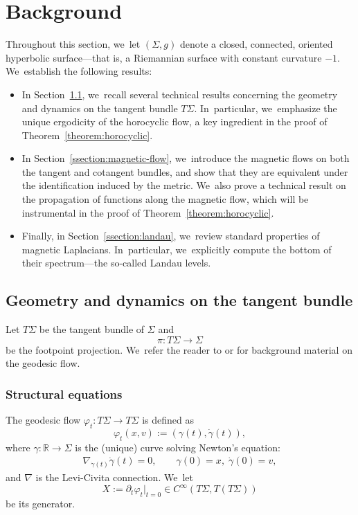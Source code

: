\documentclass[10pt]{amsart}
\theoremstyle{plain}
\theoremstyle{definition}
\newcommand{\R}{\mathbb{R}}
\begin{document}
\section{Background}

\label{section:dynamical-geometric-background}

Throughout this section, we~let $(\Sigma, g)$ denote a closed, connected, oriented hyperbolic surface—that is, a Riemannian surface with constant curvature $-1$. We~establish the following results:

\begin{itemize}
\item In Section~\ref{ssection:geo}, we~recall several technical results concerning the geometry and dynamics on the tangent bundle $T\Sigma$. In~particular, we~emphasize the unique ergodicity of the horocyclic flow, a key ingredient in the proof of Theorem~\ref{theorem:horocyclic}.

\item In Section~\ref{ssection:magnetic-flow}, we~introduce the magnetic flows on both the tangent and cotangent bundles, and show that they are equivalent under the identification induced by the metric. We~also prove a technical result on the propagation of functions along the magnetic flow, which will be instrumental in the proof of Theorem~\ref{theorem:horocyclic}.

\item Finally, in Section~\ref{ssection:landau}, we~review standard properties of magnetic Laplacians. In~particular, we~explicitly compute the bottom of their spectrum—the so-called Landau levels. \end{itemize}

\subsection{Geometry and dynamics on the tangent bundle}

\label{ssection:geo}
Let $T\Sigma$ be the tangent bundle of $\Sigma$ and
\begin{equation}
\label{equation:footpoint}
\pi : T\Sigma \to \Sigma
\end{equation}
be the footpoint projection. We~refer the reader to \cite[Ch.\,1]{Paternain-99} or \cite[Ch.\,13]{Lefeuvre-book} for background material on the geodesic flow.

\subsubsection{Structural equations} The geodesic flow $\varphi_t : T\Sigma \to T\Sigma$ is defined as
\[
\varphi_t(x,v) := (\gamma(t), \dot{\gamma}(t)),
\]
where $\gamma : \R \to \Sigma$ is the (unique) curve solving Newton's equation:
\begin{gather} \label{eq:newton_geodesic}
\nabla_{\dot{\gamma}(t)}\dot{\gamma}(t) = 0, \qquad \gamma(0)=x, \; \dot{\gamma}(0)=v,
\end{gather}
and $\nabla$ is the Levi-Civita connection. We~let
\[
X := \partial_t\varphi_t|_{t=0} \in C^\infty(T\Sigma, T(T\Sigma))
\]
be its generator.
\end{document}
